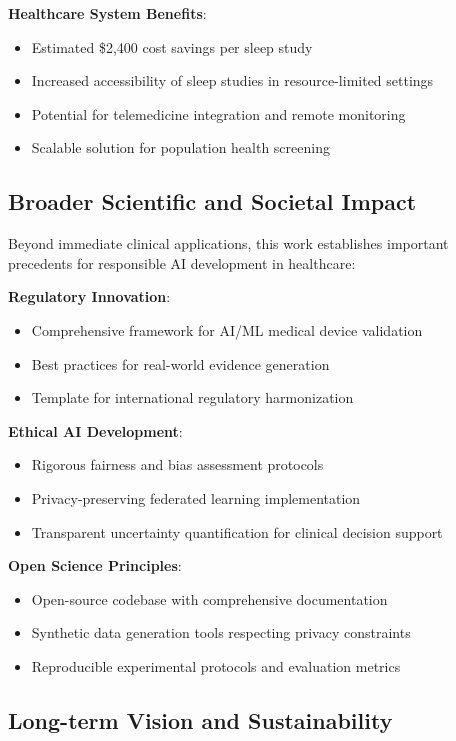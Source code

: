 \documentclass[11pt]{article}
\begin{document}
\textbf{Healthcare System Benefits}:
\begin{itemize}
    \item Estimated \$2,400 cost savings per sleep study
    \item Increased accessibility of sleep studies in resource-limited settings
    \item Potential for telemedicine integration and remote monitoring
    \item Scalable solution for population health screening
\end{itemize}

\subsection{Broader Scientific and Societal Impact}

Beyond immediate clinical applications, this work establishes important precedents for responsible AI development in healthcare:

\textbf{Regulatory Innovation}:
\begin{itemize}
    \item Comprehensive framework for AI/ML medical device validation
    \item Best practices for real-world evidence generation
    \item Template for international regulatory harmonization
\end{itemize}

\textbf{Ethical AI Development}:
\begin{itemize}
    \item Rigorous fairness and bias assessment protocols
    \item Privacy-preserving federated learning implementation
    \item Transparent uncertainty quantification for clinical decision support
\end{itemize}

\textbf{Open Science Principles}:
\begin{itemize}
    \item Open-source codebase with comprehensive documentation
    \item Synthetic data generation tools respecting privacy constraints
    \item Reproducible experimental protocols and evaluation metrics
\end{itemize}

\subsection{Long-term Vision and Sustainability}
\end{document}
